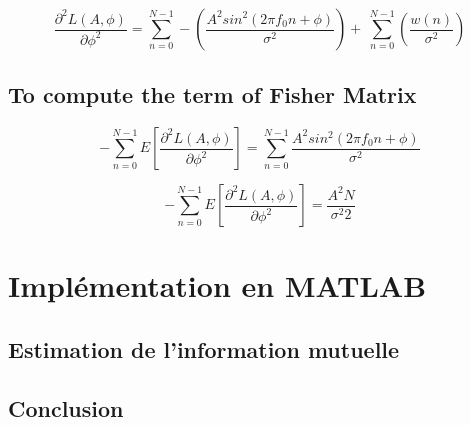 \documentclass{report}
\begin{document}
\begin{equation}\label{key}
\frac{\partial^2 L(A,\phi)}{\partial \phi^2} = \sum_{n=0}^{N-1} - (\frac{A^2sin^2(2\pi f_0 n +\phi)}{\sigma^2})+\:
\sum_{n=0}^{N-1} (\frac{w(n)}{\sigma^2})
\end{equation}

\section{To compute the term of Fisher Matrix}

\begin{equation}\label{key}
-\sum_{n=0}^{N-1} E[\frac{\partial^2 L(A,\phi)}{\partial \phi^2}] = \sum_{n=0}^{N-1}\frac{A^2sin^2(2\pi f_0 n +\phi)}{\sigma^2}
\end{equation}


\begin{equation}\label{key}
-\sum_{n=0}^{N-1} E[\frac{\partial^2 L(A,\phi)}{\partial \phi^2}] = \frac{A^2N}{\sigma^2 2}
\end{equation} 








\chapter{Implémentation en MATLAB{\small \circledR}}




\section{Estimation de l'information mutuelle}





\section{Conclusion}


\end{document}
